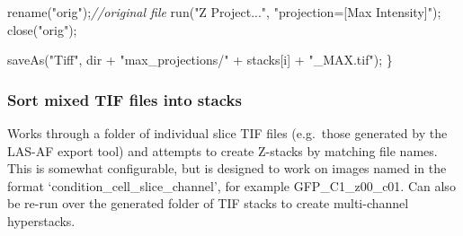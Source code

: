 \documentclass[
  12pt,
  a4paper,
]{book}
\newenvironment{Shaded}{}{}
\newcommand{\CommentTok}[1]{\textcolor[rgb]{0.38,0.63,0.69}{\textit{#1}}}
\newcommand{\NormalTok}[1]{#1}
\newcommand{\OperatorTok}[1]{\textcolor[rgb]{0.40,0.40,0.40}{#1}}
\newcommand{\StringTok}[1]{\textcolor[rgb]{0.25,0.44,0.63}{#1}}
\begin{document}
\begin{Shaded}
\begin{Highlighting}[]
\NormalTok{    rename}\OperatorTok{(}\StringTok{"orig"}\OperatorTok{);}\CommentTok{//original file}
\NormalTok{    run}\OperatorTok{(}\StringTok{"Z Project..."}\OperatorTok{,} \StringTok{"projection=[Max Intensity]"}\OperatorTok{);}
\NormalTok{    close}\OperatorTok{(}\StringTok{"orig"}\OperatorTok{);}

\NormalTok{    saveAs}\OperatorTok{(}\StringTok{"Tiff"}\OperatorTok{,}\NormalTok{ dir }\OperatorTok{+} \StringTok{"max\_projections/"} \OperatorTok{+}\NormalTok{ stacks}\OperatorTok{[}\NormalTok{i}\OperatorTok{]} \OperatorTok{+} \StringTok{"\_MAX.tif"}\OperatorTok{);}
\OperatorTok{\}}
\end{Highlighting}
\end{Shaded}

\hypertarget{sort-mixed-tif-files-into-stacks}{%
\subsubsection{Sort mixed TIF files into stacks}\label{sort-mixed-tif-files-into-stacks}}

Works through a folder of individual slice TIF files (e.g.~those generated by the LAS-AF export tool) and attempts to create Z-stacks by matching file names. This is somewhat configurable, but is designed to work on images named in the format `condition\_cell\_slice\_channel', for example GFP\_C1\_z00\_c01. Can also be re-run over the generated folder of TIF stacks to create multi-channel hyperstacks.
\end{document}
